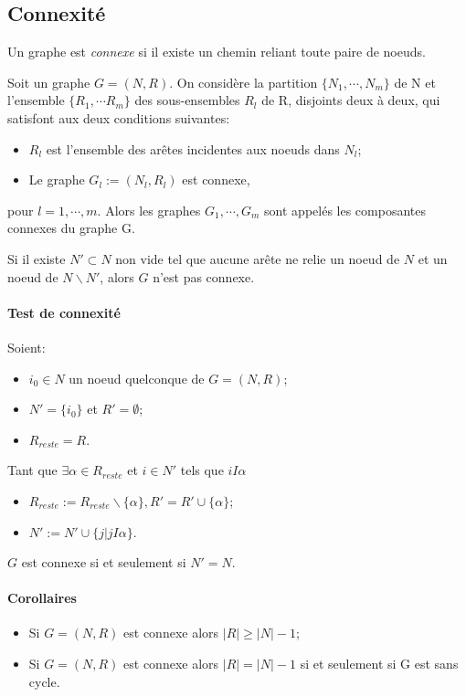 \subsection{Connexité}
Un graphe est \emph{connexe}
si il existe un chemin reliant toute paire de noeuds.

Soit un graphe $G = (N, R)$.
On considère la partition $\{N_1, \cdots , N_m\}$ de N
et l'ensemble $\{R_1, \cdots R_m\}$ des sous-ensembles $R_l$ de R,
disjoints deux à deux, qui satisfont aux deux conditions suivantes:
\begin{itemize}
  \item $R_l$ est l'ensemble des arêtes incidentes aux noeuds dans $N_l$;
  \item Le graphe $G_l := (N_l, R_l)$ est connexe,
\end{itemize}
pour $l = 1, \cdots , m$. Alors les graphes $G_1, \cdots , G_m$
sont appelés les composantes connexes du graphe G.

Si il existe $N' \subset N$ non vide tel que aucune arête ne relie
un noeud de $N$ et un noeud de $N\backslash N'$, alors $G$ n'est pas connexe.

\paragraph{Test de connexité}
Soient:
\begin{itemize}
  \item $i_0 \in N$ un noeud quelconque de $G = (N,R)$;
  \item $N' = \{i_0\}$ et $R' = \emptyset$;
  \item $R_{reste} = R$.
\end{itemize}
Tant que $\exists \alpha \in R_{reste}$ et $i \in N'$ tels que $iI\alpha$
\begin{itemize}
  \item $R_{reste} := R_{reste}\backslash \{\alpha\},
    R' = R' \cup \{\alpha\}$;
  \item $N' := N' \cup \{j | jI\alpha\}$.
\end{itemize}
$G$ est connexe si et seulement si $N' = N$.

\paragraph{Corollaires}
\begin{itemize}
  \item Si $G = (N,R)$ est connexe alors $|R| \geq |N| - 1$;
  \item Si $G = (N,R)$ est connexe alors $|R| = |N| - 1$
    si et seulement si G est sans cycle.
\end{itemize}

